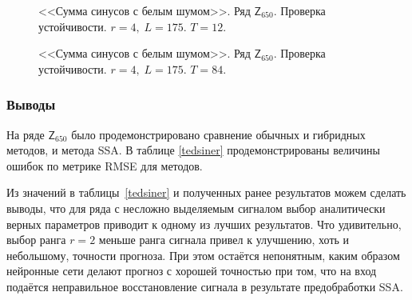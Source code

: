 \documentclass[specialist,
               substylefile = spbu.rtx,
               subf,href,colorlinks=true, 12p]{disser}
\begin{document}
\begin{figure}[h]
	\captionsetup{justification=centering}
	\caption{<<Сумма синусов с белым шумом>>. Ряд $\mathsf{Z}_{650}$. Проверка устойчивости. $r = 4, \; L = 175$. $T = 12$.}
	\label{edsiner4.12}
\end{figure}

\begin{figure}[h]
	\captionsetup{justification=centering}
	\caption{<<Сумма синусов с белым шумом>>. Ряд $\mathsf{Z}_{650}$. Проверка устойчивости. $r = 4, \; L = 175$. $T = 84$.}
	\label{edsiner4.84}
\end{figure}

\subsubsection{Выводы}
На ряде $\mathsf{Z}_{650}$ было продемонстрировано сравнение обычных и гибридных методов, и метода SSA. В таблице \ref{tedsiner} продемонстрированы величины ошибок по метрике RMSE для методов.

Из значений в таблицы~\ref{tedsiner} и полученных ранее результатов можем сделать выводы, что для ряда с несложно выделяемым сигналом выбор аналитически верных параметров приводит к одному из лучших результатов. Что удивительно, выбор ранга $r=2$ меньше ранга сигнала привел к улучшению, хоть и небольшому, точности прогноза. При этом остаётся непонятным, каким образом нейронные сети делают прогноз с хорошей точностью при том, что на вход подаётся неправильное восстановление сигнала в результате предобработки SSA.
\end{document}
